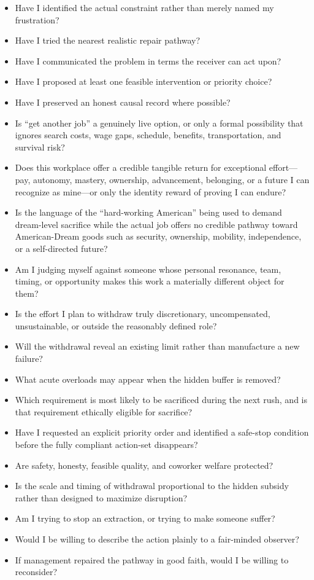 \documentclass[11pt,oneside]{article}
\providecommand{\tightlist}{%
  \setlength{\itemsep}{0.22em}\setlength{\parskip}{0pt}}
\begin{document}
\begin{itemize}
\tightlist
\item
  Have I identified the actual constraint rather than merely named my
  frustration?
\item
  Have I tried the nearest realistic repair pathway?
\item
  Have I communicated the problem in terms the receiver can act upon?
\item
  Have I proposed at least one feasible intervention or priority choice?
\item
  Have I preserved an honest causal record where possible?
\item
  Is ``get another job'' a genuinely live option, or only a formal
  possibility that ignores search costs, wage gaps, schedule, benefits,
  transportation, and survival risk?
\item
  Does this workplace offer a credible tangible return for exceptional
  effort---pay, autonomy, mastery, ownership, advancement, belonging, or
  a future I can recognize as mine---or only the identity reward of
  proving I can endure?
\item
  Is the language of the ``hard-working American'' being used to demand
  dream-level sacrifice while the actual job offers no credible pathway
  toward American-Dream goods such as security, ownership, mobility,
  independence, or a self-directed future?
\item
  Am I judging myself against someone whose personal resonance, team,
  timing, or opportunity makes this work a materially different object
  for them?
\item
  Is the effort I plan to withdraw truly discretionary, uncompensated,
  unsustainable, or outside the reasonably defined role?
\item
  Will the withdrawal reveal an existing limit rather than manufacture a
  new failure?
\item
  What acute overloads may appear when the hidden buffer is removed?
\item
  Which requirement is most likely to be sacrificed during the next
  rush, and is that requirement ethically eligible for sacrifice?
\item
  Have I requested an explicit priority order and identified a safe-stop
  condition before the fully compliant action-set disappears?
\item
  Are safety, honesty, feasible quality, and coworker welfare protected?
\item
  Is the scale and timing of withdrawal proportional to the hidden
  subsidy rather than designed to maximize disruption?
\item
  Am I trying to stop an extraction, or trying to make someone suffer?
\item
  Would I be willing to describe the action plainly to a fair-minded
  observer?
\item
  If management repaired the pathway in good faith, would I be willing
  to reconsider?
\end{itemize}
\end{document}
